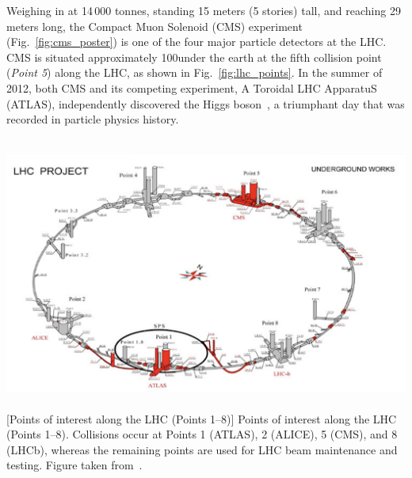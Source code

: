 Weighing in at 14\,000 tonnes, standing 15 meters (5 stories) tall, and reaching 29 meters long, the Compact Muon Solenoid (CMS) experiment (Fig.~\ref{fig:cms_poster}) is one of 
the four major particle detectors at the LHC.
CMS is situated approximately 100\meter under the earth at the fifth collision point (\emph{Point 5}) along the LHC, as shown in Fig.~\ref{fig:lhc_points}.
In the summer of 2012, both CMS and its competing experiment, A Toroidal LHC ApparatuS (ATLAS), independently discovered the Higgs boson~\cite{chatrchyan_observation_2012, aad_observation_2012, chatrchyan_observation_2013}, a triumphant day that was recorded in particle physics history.
\begin{multiFigure}
    \centering
    \includegraphics[height=9cm,keepaspectratio]{figures/cms/lhc_points_with_buildings.png}
        [Points of interest along the LHC (Points 1--8)]
        {Points of interest along the LHC (Points 1--8).
        Collisions occur at Points 1 (ATLAS), 2 (ALICE), 5 (CMS), and 8 (LHCb), whereas the remaining points are used for LHC beam maintenance and testing.
        Figure taken from~\cite{lhc_poi}.} 
    \label{fig:lhc_points}
\end{multiFigure}

